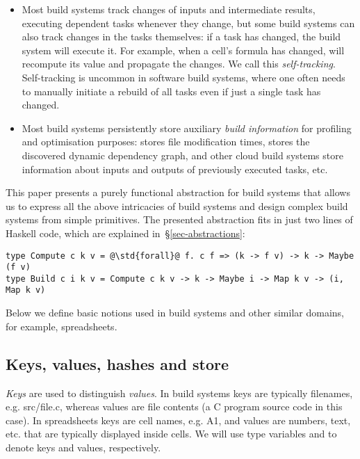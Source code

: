 \begin{itemize}
    \item Most build systems track changes of inputs and intermediate results,
    executing dependent tasks whenever they change, but some build systems can
    also track changes in the tasks themselves: if a task has changed, the build
    system will execute it. For example, when a cell's formula has changed,
    \Excel will recompute its value and propagate the changes. We call this
    \emph{self-tracking}. Self-tracking is uncommon in software build systems,
    where one often needs to manually initiate a rebuild of all tasks even if
    just a single task has changed.

    \item Most build systems persistently store auxiliary \emph{build
    information} for profiling and optimisation purposes: \Make stores file
    modification times, \Shake stores the discovered dynamic dependency graph,
    \Bazel and other cloud build systems store information about inputs and
    outputs of previously executed tasks, etc.
\end{itemize}

This paper presents a purely functional abstraction for build systems that
allows us to express all the above intricacies of build systems and design
complex build systems from simple primitives. The presented abstraction fits in
just two lines of Haskell code, which are explained
in~\S\ref{sec-abstractions}:

\begin{verbatim}
type Compute c k v = @\std{forall}@ f. c f => (k -> f v) -> k -> Maybe (f v)
type Build c i k v = Compute c k v -> k -> Maybe i -> Map k v -> (i, Map k v)
\end{verbatim}


Below we define basic notions used in build systems and other similar domains,
for example, spreadsheets.

\subsection{Keys, values, hashes and store}

\emph{Keys} are used to distinguish \emph{values}. In build systems keys are
typically filenames, e.g. \textsf{src/file.c}, whereas values are file contents
(a C program source code in this case). In spreadsheets keys are cell names,
e.g. \textsf{A1}, and values are numbers, text, etc. that are typically displayed
inside cells. We will use type variables  and  to denote keys and
values, respectively.

